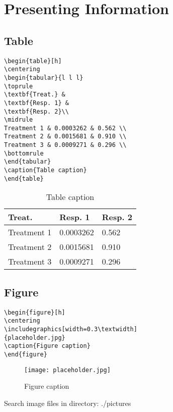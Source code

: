 \chapter{Presenting Information}

\lipsum[1] 
\section{Table}
\lipsum[1] 
\lipsum[1][1-3]
\begin{notebox}
\begin{verbatim}
\begin{table}[h]
\centering
\begin{tabular}{l l l}
\toprule
\textbf{Treat.} & 
\textbf{Resp. 1} & 
\textbf{Resp. 2}\\
\midrule
Treatment 1 & 0.0003262 & 0.562 \\
Treatment 2 & 0.0015681 & 0.910 \\
Treatment 3 & 0.0009271 & 0.296 \\
\bottomrule
\end{tabular}
\caption{Table caption}
\end{table}
\end{verbatim}
\end{notebox}
\begin{table}[h]
\centering
\begin{tabular}{l l l}
\toprule
\textbf{Treat.} & \textbf{Resp. 1} & \textbf{Resp. 2}\\
\midrule
Treatment 1 & 0.0003262 & 0.562 \\
Treatment 2 & 0.0015681 & 0.910 \\
Treatment 3 & 0.0009271 & 0.296 \\
\bottomrule
\end{tabular}
\caption{Table caption}
\end{table}

\section{Figure}

\lipsum[1] 

\begin{notebox}
\begin{verbatim}
\begin{figure}[h]
\centering
\includegraphics[width=0.3\textwidth]
{placeholder.jpg}
\caption{Figure caption}
\end{figure}
\end{verbatim}
\end{notebox}
\begin{figure}[h]
\centering\texttt{[image: placeholder.jpg]}
\caption{Figure caption}
\end{figure}

\begin{attentionbox}
Search image files in directory: ./pictures\\
\end{attentionbox}

